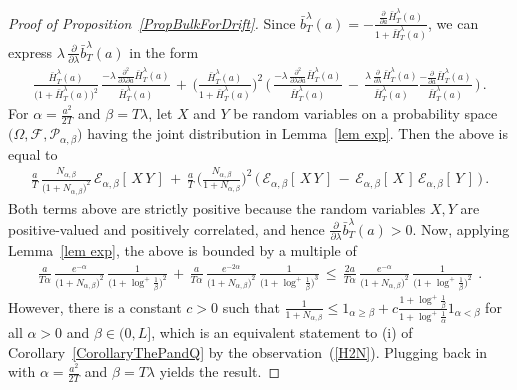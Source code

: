 \documentclass[10pt]{article}
\numberwithin{equation}{section}
\theoremstyle{definition}
\begin{document}
\begin{proof}[Proof of Proposition~\ref{PropBulkForDrift}] Since $\bar{b}_{T}^{\lambda}(a)=-\frac{ \frac{\partial}{\partial a}\bar{H}_{T}^{\lambda}(a) }{1+ \bar{H}_{T}^{\lambda}(a)   } $, we can express $ \lambda\,\frac{\partial}{\partial \lambda}\bar{b}_{T}^{\lambda}(a)$ in the form
\begin{align*} 
   \frac{ \bar{H}_{T}^{\lambda}(a)  }{ \big(1+ \bar{H}_{T}^{\lambda}(a)  \big)^2 }\, \frac{ -\lambda   \, \frac{\partial^2}{\partial \lambda \partial a} \bar{H}_{T}^{\lambda}(a) 
  }{\bar{H}_{T}^{\lambda}(a)  } \,+\,  \bigg(\frac{\bar{H}_{T}^{\lambda}(a)  }{ 1+ \bar{H}_{T}^{\lambda}(a)   } \bigg)^2\,\Bigg(\,\frac{ -\lambda    \,\frac{\partial^2}{\partial \lambda \partial a} \bar{H}_{T}^{\lambda}(a) 
  }{\bar{H}_{T}^{\lambda}(a)  }\,-\, \frac{ \lambda  \,  \frac{\partial}{\partial \lambda } \bar{H}_{T}^{\lambda}(a) 
  }{\bar{H}_{T}^{\lambda}(a)  }\frac{    - \frac{\partial}{\partial a} \bar{H}_{T}^{\lambda}(a) 
  }{\bar{H}_{T}^{\lambda}(a)  }\,\Bigg) \,.
\end{align*}
For $\alpha=\frac{a^2}{2T}$ and $ 
\beta=T\lambda $, let $X$ and $Y$ be random variables on a probability space $\big(\Omega,\mathcal{F},\mathcal{P}_{\alpha,\beta} \big)$ having the joint distribution in Lemma~\ref{lem exp}. Then the above is equal to 
\begin{align*} 
    \frac{a}{T} \,\frac{ N_{\alpha,\beta}  }{ \big(1+ N_{\alpha,\beta} \big)^2 }\,  \mathcal{E}_{\alpha,\beta}[\,X\,Y\,]\, + \, \frac{a}{T}\, \bigg(\frac{N_{\alpha,\beta} }{ 1+ N_{\alpha,\beta}  } \bigg)^2\,\Big(\,  \mathcal{E}_{\alpha,\beta}[\,X\,Y\,]\,-\,  \mathcal{E}_{\alpha,\beta}[\,X\,]\,\mathcal{E}_{\alpha,\beta}[\,Y\,]\,\Big) \,.
\end{align*}
Both terms above are strictly positive  because the  random variables $X,Y$ are positive-valued and  positively correlated, and hence  $\frac{\partial}{\partial \lambda}\bar{b}_{T}^{\lambda}(a) >0$. Now, applying Lemma~\ref{lem exp}, the above is bounded by a multiple of 
\begin{align*} 
    \frac{a}{T\alpha} \,\frac{  e^{-\alpha  }  }{ \big(1+ N_{\alpha,\beta} \big)^2 } \,  \frac{1}{\big(1+\log^+\frac{1}{\beta}\big)^2 }\,+\, \frac{a}{T\alpha}\, \frac{e^{-2\alpha  } }{ \big(1+ N_{\alpha,\beta} \big)^2 } \, \frac{1}{\big(1+\log^+\frac{1}{\beta}\big)^3 } \,\leq \,   \frac{2a}{T\alpha} \,\frac{  e^{-\alpha  }  }{ \big(1+ N_{\alpha,\beta} \big)^2 }  \, \frac{1}{\big(1+\log^+\frac{1}{\beta}\big)^2 }\ \,.
\end{align*}
However, there is a constant $c>0$ such that $\frac{1}{1+N_{\alpha,\beta}}\leq 1_{\alpha\geq \beta} +c\frac{1+\log^+ \frac{1}{\beta}}{1+\log^+\frac{1}{\alpha}   }   1_{\alpha < \beta} $ for all $\alpha>0$ and $\beta\in (0,L] $, which  is an equivalent statement to (i) of Corollary~\ref{CorollaryThePandQ} by the observation~(\ref{H2N}).  Plugging back in with $\alpha=\frac{a^2}{2T}$ and $ 
\beta=T\lambda $ yields the result.
\end{proof}
\end{document}
